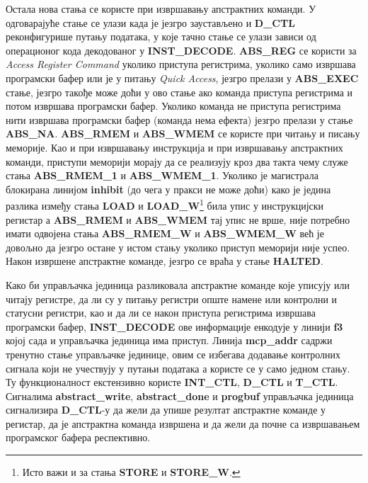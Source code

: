 Остала нова стања се користе при извршавању апстрактних команди. У одговарајуће стање се улази када је језгро заустављено и \textbf{D\_CTL}
реконфигурише путању података, у које тачно стање се улази зависи од операционог кода декодованог у \textbf{INST\_DECODE}. \textbf{ABS\_REG} се користи за \textit{Access Register Command} уколико приступа регистрима, уколико само извршава програмски бафер или је у питању \textit{Quick Access}, језгро прелази у \textbf{ABS\_EXEC} стање, језгро такође може доћи у ово стање ако команда приступа регистрима и потом извршава програмски бафер. Уколико команда не приступа регистрима нити извршава програмски бафер (команда нема ефекта) језгро прелази у стање \textbf{ABS\_NA}. \textbf{ABS\_RMEM} и \textbf{ABS\_WMEM} се користе при читању и писању меморије. Као и при извршавању инструкција и при извршавању апстрактних команди, приступи меморији морају да се реализују кроз два такта чему служе стања \textbf{ABS\_RMEM\_1} и \textbf{ABS\_WMEM\_1}. Уколико је магистрала блокирана линијом \textbf{inhibit} (до чега у пракси не може доћи) како је једина разлика између стања \textbf{LOAD} и \textbf{LOAD\_W}\footnote{Исто важи и за стања \textbf{STORE} и \textbf{STORE\_W}.} била упис у инструкцијски регистар а \textbf{ABS\_RMEM} и \textbf{ABS\_WMEM} тај упис не врше, није потребно имати одвојена стања \textbf{ABS\_RMEM\_W} и \textbf{ABS\_WMEM\_W} већ је довољно да језгро остане у истом стању уколико приступ меморији није успео. Након извршене апстрактне команде, језгро се враћа у стање \textbf{HALTED}.

Како би управљачка јединица разликовала апстрактне команде које уписују или читају регистре, да ли су у питању регистри опште намене или контролни и статусни регистри, као и да ли се након приступа регистрима извршава програмски бафер, \textbf{INST\_DECODE} ове информације енкодује у линији \textbf{f3} којој сада и управљачка јединица има приступ. Линија \textbf{mcp\_addr} садржи тренутно стање управљачке јединице, овим се избегава додавање контролних сигнала који не учествују у путањи података а користе се у само једном стању. Ту функционалност екстензивно користе \textbf{INT\_CTL}, \textbf{D\_CTL} и \textbf{T\_CTL}. Сигналима \textbf{abstract\_write}, \textbf{abstract\_done} и \textbf{progbuf} управљачка јединица сигнализира \textbf{D\_CTL}-у да жели да упише резултат апстрактне команде у регистар, да је апстрактна команда извршена и да жели да почне са извршавањем програмског бафера респективно.



